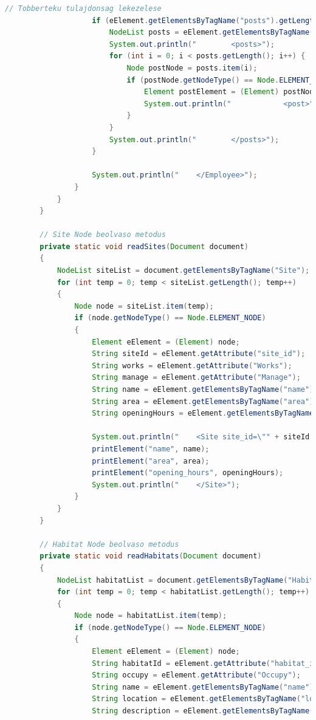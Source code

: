 \documentclass[12pt]{report}
\begin{document}
\begin{lstlisting}[caption={DOMReadKLNSPG.java} adatolvasó program, language=Java]
					// Tobberteku tulajdonsag lekezelese
					if (eElement.getElementsByTagName("posts").getLength() > 0) {
						NodeList posts = eElement.getElementsByTagName("posts").item(0).getChildNodes();
						System.out.println("        <posts>");
						for (int i = 0; i < posts.getLength(); i++) {
							Node postNode = posts.item(i);
							if (postNode.getNodeType() == Node.ELEMENT_NODE) {
								Element postElement = (Element) postNode;
								System.out.println("            <post>" + postElement.getTextContent() + "</post>");
							}
						}
						System.out.println("        </posts>");
					}
					
					System.out.println("    </Employee>");
				}
			}
		}
		
		// Site Node beolvaso metodus
		private static void readSites(Document document) 
		{
			NodeList siteList = document.getElementsByTagName("Site");
			for (int temp = 0; temp < siteList.getLength(); temp++) 
			{
				Node node = siteList.item(temp);
				if (node.getNodeType() == Node.ELEMENT_NODE) 
				{
					Element eElement = (Element) node;
					String siteId = eElement.getAttribute("site_id");
					String works = eElement.getAttribute("Works");
					String manage = eElement.getAttribute("Manage");
					String name = eElement.getElementsByTagName("name").item(0).getTextContent();
					String area = eElement.getElementsByTagName("area").item(0).getTextContent();
					String openingHours = eElement.getElementsByTagName("opening_hours").item(0).getTextContent();
					
					System.out.println("    <Site site_id=\"" + siteId + "\" Works=\"" + works + "\" Manage=\"" + manage + "\">");
					printElement("name", name);
					printElement("area", area);
					printElement("opening_hours", openingHours);
					System.out.println("    </Site>");
				}
			}
		}
		
		// Habitat Node beolvaso metodus
		private static void readHabitats(Document document) 
		{
			NodeList habitatList = document.getElementsByTagName("Habitat");
			for (int temp = 0; temp < habitatList.getLength(); temp++) 
			{
				Node node = habitatList.item(temp);
				if (node.getNodeType() == Node.ELEMENT_NODE) 
				{
					Element eElement = (Element) node;
					String habitatId = eElement.getAttribute("habitat_id");
					String occupy = eElement.getAttribute("Occupy");
					String name = eElement.getElementsByTagName("name").item(0).getTextContent();
					String location = eElement.getElementsByTagName("location").item(0).getTextContent();
					String description = eElement.getElementsByTagName("description").item(0).getTextContent();
					

\end{lstlisting}
\end{document}
